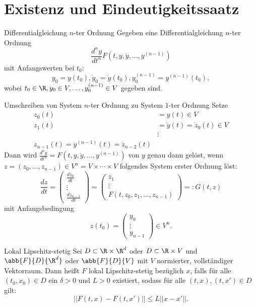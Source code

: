 \section{Existenz und Eindeutigkeitssaatz}

\begin{karte}{Differentialgleichung \(n\)-ter Ordnung}
    Gegeben eine Differentialgleichung \(n\)-ter Ordnung
    \[ \frac{d^n y}{dt^n} F(t,y,\dot{y}, \ldots, y^{(n-1)}) \]
    mit Anfangswerten bei \(t_0\): 
    \[ y_0 = y(t_0), \dot{y}_0 = \dot{y}(t_0), y_0^{(n-1)} = y^{(n-1)}(t_0), \]
    wobei \(t_0\in\R, y_0 \in V, \ldots, y_0^{(n-1)} \in V\) gegeben sind.
\end{karte}

\begin{karte}{Umschreiben von System \(n\)-ter Ordnung zu System \(1\)-ter Ordnung}
    Setze 
    \begin{align*}
        z_0(t) &= y(t) \in V \\
        z_1(t) &= \dot{y}(t) = \dot{z}_0(t)\in V \\
        &\vdots \\
        z_{n-1}(t) = y^{(n-1)}(t) = \dot{z}_{n-2}(t)
    \end{align*}
    Dann wird \(\frac{d^n y}{dt^n} = F(t,y,\dot{y},\ldots, y^{(n-1)})\) 
    von \(y\) genau dann gelöst, wenn \(z = (z_0,\ldots, z_{n-1}) \in V^n = V\times \cdots \times V \)
    folgendes System erster Ordnung löst:
    \[ \frac{dz}{dt} = \begin{pmatrix}
        \frac{dz_0}{dt} \\
        \vdots \\
        \frac{d z_{n-1}}{dt}
    \end{pmatrix} 
    = \begin{pmatrix}
        z_1 \\
        \vdots \\
        F(t,z_0,z_1, \ldots, z_{n-1})
    \end{pmatrix} =: G(t,z) \]
    mit Anfangsbedingung 
    \[ z(t_0) = \begin{pmatrix}
        y_0 \\
        \vdots \\
        y_{n-1}
    \end{pmatrix} \in V^n. \]
\end{karte}

\begin{karte}{Lokal Lipschitz-stetig}
    Sei \(D\subset \R \times \R^d\) 
    oder \(D \subset \R \times V\) und \(\abb{F}{D}{\R^d}\) 
    oder \(\abb{F}{D}{V}\) mit \(V\) normierter, vollständiger 
    Vektorraum. Dann heißt \(F\) lokal Lipschitz-stetig bezüglich 
    \(x\), falls für alle \((t_0, x_0)\in D\) ein \(\delta > 0\) 
    und \(L>0\) existiert, sodass für alle \((t,x),(t,x')\in D\) gilt: 
    \[ ||F(t,x) - F(t,x') || \leq L ||x-x'||. \]
\end{karte}

